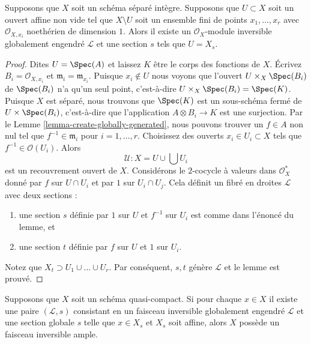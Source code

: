 \begin{lemma}
\label{lemma-find-globally-generated}
Supposons que $X$ soit un schéma séparé intègre. Supposons que $U \subset
X$ soit un ouvert affine non vide tel que $X \setminus U$ soit un
ensemble fini de points $x_1, \ldots, x_r$ avec $\mathcal{O}_{X, x_i}$
noethérien de dimension $1$. Alors il existe un $\mathcal{O}_X$-module
inversible globalement engendré $\mathcal{L}$ et une section $s$ tels que $U = X_s$.
\end{lemma}

\begin{proof}
Dites $U = \Spec(A)$ et laissez $K$ être le corps des fonctions de
$X$. Écrivez $B_i = \mathcal{O}_{X, x_i}$ et $\mathfrak m_i =
\mathfrak m_{x_i}$. Puisque $x_i \not \in U$ nous voyons que
l'ouvert $U \times_X \Spec(B_i)$ de $\Spec(B_i)$ n'a qu'un seul
point, c'est-à-dire $U \times_X \Spec(B_i) = \Spec(K)$. Puisque $X$
est séparé, nous trouvons que $\Spec(K)$ est un sous-schéma fermé de
$U \times \Spec(B_i)$, c'est-à-dire que l'application $A \otimes B_i
\to K$ est une surjection. Par le Lemme
\ref{lemma-create-globally-generated}, nous pouvons trouver un $f \in A$ non
nul tel que $f^{-1} \in \mathfrak m_i$ pour $i = 1, \ldots, r$. Choisissez des
ouverts $x_i \in U_i \subset X$ tels que $f^{-1} \in \mathcal{O}(U_i)$. Alors
$$
\mathcal{U} : X = U \cup \bigcup U_i
$$
est un recouvrement ouvert de $X$. Considérons le
$2$-cocycle à valeurs dans $\mathcal{O}_X^*$ donné par $f$
sur $U \cap U_i$ et par $1$ sur $U_i \cap U_j$. Cela
définit un fibré en droites $\mathcal{L}$ avec deux sections :
\begin{enumerate}
\item une section $s$ définie par $1$ sur
$U$ et $f^{-1}$ sur $U_i$ est comme dans
l'énoncé du lemme, et \item une section $t$
définie par $f$ sur $U$ et $1$ sur $U_i$.
\end{enumerate}
Notez que $X_t \supset U_1 \cup \ldots \cup U_r$. Par
conséquent, $s, t$ génère $\mathcal{L}$ et le lemme est prouvé.
\end{proof}

\begin{lemma}
\label{lemma-enough-globally-generated-ample}
Supposons que $X$ soit un schéma quasi-compact. Si pour
chaque $x \in X$ il existe une paire $(\mathcal{L}, s)$
consistant en un faisceau inversible globalement engendré
$\mathcal{L}$ et une section globale $s$ telle que $x \in X_s$ et
$X_s$ soit affine, alors $X$ possède un faisceau inversible ample.
\end{lemma}

